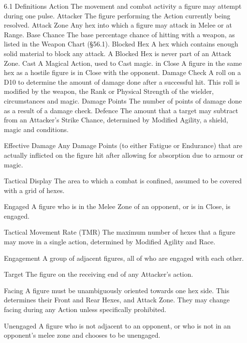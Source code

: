 \documentclass[a4paper]{article}
\begin{document}
\begin{multicols}{3}
6.1 Definitions
Action The movement and combat activity a figure
may attempt during one pulse.
Attacker The figure performing the Action currently being resolved.
Attack Zone Any hex into which a figure may
attack in Melee or at Range.
Base Chance The base percentage chance of hitting with a weapon, as listed in the Weapon Chart
(§56.1).
Blocked Hex A hex which contains enough solid
material to block any attack. A Blocked Hex is
never part of an Attack Zone.
Cast A Magical Action, used to Cast magic.
in Close A figure in the same hex as a hostile
figure is in Close with the opponent.
Damage Check A roll on a D10 to determine the
amount of damage done after a successful hit. This
roll is modified by the weapon, the Rank or Physical Strength of the wielder, circumstances and
magic.
Damage Points The number of points of damage
done as a result of a damage check.
Defence The amount that a target may subtract
from an Attacker’s Strike Chance, determined by
Modified Agility, a shield, magic and conditions.

Effective Damage Any Damage Points (to either
Fatigue or Endurance) that are actually inflicted on
the figure hit after allowing for absorption due to
armour or magic.

Tactical Display The area to which a combat is
confined, assumed to be covered with a grid of
hexes.

Engaged A figure who is in the Melee Zone of an
opponent, or is in Close, is engaged.

Tactical Movement Rate (TMR) The maximum
number of hexes that a figure may move in a single
action, determined by Modified Agility and Race.

Engagement A group of adjacent figures, all of
who are engaged with each other.

Target The figure on the receiving end of any
Attacker’s action.

Facing A figure must be unambiguously oriented
towards one hex side. This determines their Front
and Rear Hexes, and Attack Zone. They may
change facing during any Action unless specifically prohibited.

Unengaged A figure who is not adjacent to an
opponent, or who is not in an opponent’s melee
zone and chooses to be unengaged.


\end{multicols}
\end{document}
